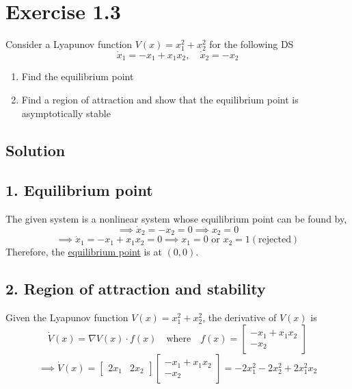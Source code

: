 \section*{Exercise 1.3}

Consider a Lyapunov function \( V(x)=x_{1}^{2}+x_{2}^{2} \) for the following DS
\begin{equation*}
    \dot{x}_{1}=-x_{1}+x_{1} x_{2}, \quad \dot{x}_{2}=-x_{2}
\end{equation*}
\begin{enumerate}[noitemsep]
    \item Find the equilibrium point
    \item Find a region of attraction and show that the equilibrium point is asymptotically stable
\end{enumerate}

\subsection*{Solution}

\subsection*{1. Equilibrium point}

The given system is a nonlinear system whose equilibrium point can be found by,
\[
    \implies
    \dot{x}_{2} = -x_{2} = 0
    \implies
    x_{2} = 0
\]
\[
    \implies
    \dot{x}_{1} = -x_{1} + x_{1} x_{2} = 0
    \implies
    x_{1} = 0 \text{ or } x_{2} = 1 (\text{rejected})
\]
Therefore, the \underline{equilibrium point} is at \( \boxed{ (0, 0) } \).

\subsection*{2. Region of attraction and stability}

Given the Lyapunov function \( V(x) = x_{1}^{2} + x_{2}^{2} \), the derivative of \( V(x) \) is
\[
    \dot{V}(x) = \nabla V(x) \cdot f(x)
    \quad \text{where} \quad
    f(x) = \begin{bmatrix} -x_{1} + x_{1} x_{2} \\ -x_{2} \end{bmatrix}
\]
\[
    \implies
    \dot{V}(x) = \begin{bmatrix} 2x_{1} & 2x_{2} \end{bmatrix}
    \begin{bmatrix} -x_{1} + x_{1} x_{2} \\ -x_{2} \end{bmatrix}
    = -2x_{1}^{2} - 2x_{2}^{2} + 2x_{1}^{2} x_{2}
\]
